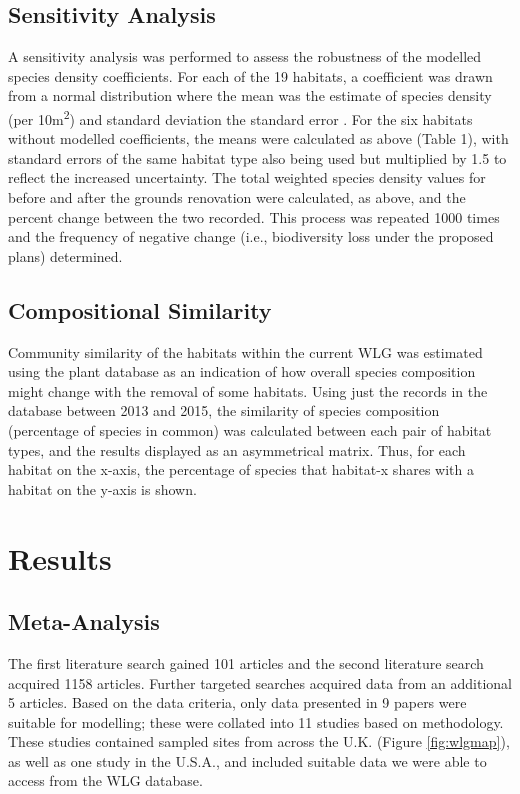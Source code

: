 \subsection{Sensitivity Analysis}
A sensitivity analysis was performed to assess the robustness of the modelled species density coefficients. For each of the 19 habitats, a coefficient was drawn from a normal distribution where the mean was the estimate of species density (per 10m\textsuperscript{2}) and standard deviation the standard error \citep{Newbold:2015nat}. For the six habitats without modelled coefficients, the means were calculated as above (Table 1), with standard errors of the same habitat type also being used but multiplied by 1.5 to reflect the increased uncertainty. The total weighted species density values for before and after the grounds renovation were calculated, as above, and the percent change between the two recorded.  This process was repeated 1000 times and the frequency of negative change (i.e., biodiversity loss under the proposed plans) determined.

\subsection{Compositional Similarity}
Community similarity of the habitats within the current WLG was estimated using the plant database as an indication of how overall species composition might change with the removal of some habitats.  Using just the records in the database between 2013 and 2015, the similarity of species composition (percentage of species in common) was calculated between each pair of habitat types, and the results displayed as an asymmetrical matrix. Thus, for each habitat on the x-axis, the percentage of species that habitat-x shares with a habitat on the y-axis is shown.

\section{Results}
\subsection{Meta-Analysis}
The first literature search gained 101 articles and the second literature search acquired 1158 articles.  Further targeted searches acquired data from an additional 5 articles. Based on the data criteria, only data presented in 9 papers were suitable for modelling; these were collated into 11 studies based on methodology.  These studies contained sampled sites from across the U.K. (Figure \ref{fig:wlgmap}), as well as one study in the U.S.A., and included suitable data we were able to access from the WLG database.

